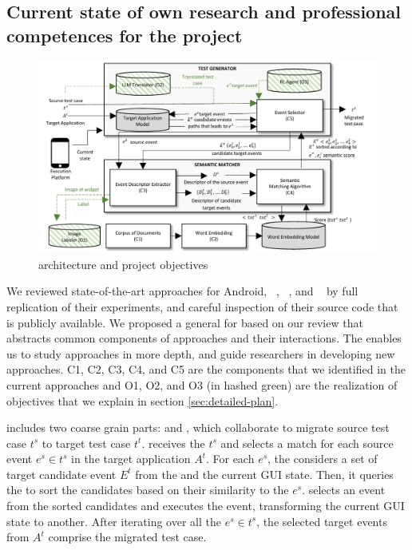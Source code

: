 	
\subsection{Current state of own research and professional competences for the project}
\label{sec:own-research}

\begin{figure}[h]
	\centering
	\includegraphics[width=\textwidth]{images/architecture.pdf}
	\caption{\testreuse architecture and project objectives}
	\label{fig:architecture}
\end{figure}

We reviewed state-of-the-art \testreuse approaches for Android, \atm~\cite{behrang:apptestmigrator:ASE:2019}, \craftdroid~\cite{lin:craftdroid:ASE:2019}, and \adaptdroid~\cite{Mariani:Adaptdroid:AST:2021} by full replication of their experiments, and careful inspection of their source code that is publicly available.
We proposed a general \architecture for \testreuse based on our review that abstracts common components of \testreuse approaches and their interactions. 
The \architecture enables us to study \testreuse approaches in more depth, and guide researchers in developing new approaches.
C1, C2, C3, C4, and C5 are the components that we identified in the current approaches and O1, O2, and O3 (in hashed green) are the realization of \project objectives that we explain in section \ref{sec:detailed-plan}. 


\bigskip
\testreuse  includes two coarse grain parts: \generator and \matcher, which collaborate to migrate source test case $t^s$ to target test case $t^t$.
\generator receives the $t^s$ and selects a match for each source event $e^s \in t^s$ in the target application $A^t$.
For each $e^s$, the \generator considers a set of target candidate event $E^t$ from the \tam and the current GUI state. 
Then, it queries the \matcher to sort the candidates based on their similarity to the $e^s$.
\generator selects an event from the sorted candidates and executes the event, transforming the current GUI state to another. 
After iterating over all the $e^s \in t^s$, the selected target events from $A^t$ comprise the migrated test case.



